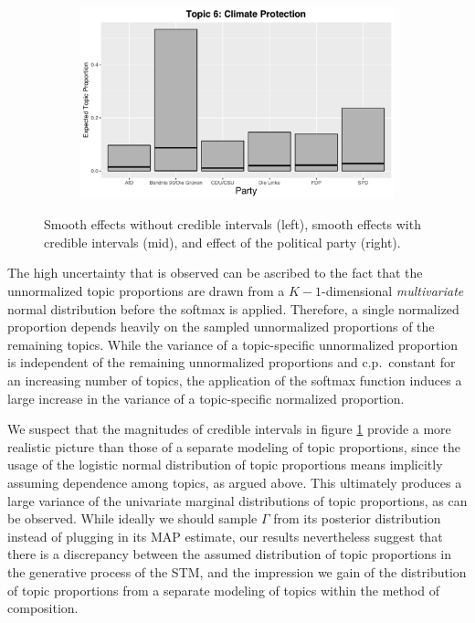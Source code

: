 \begin{figure}[h!]
\begin{subfigure}[b]{0.3\linewidth}
    \includegraphics[width=\linewidth]{../plots/5_1/direct_t6_cat.pdf}
  \end{subfigure}
  \caption{Smooth effects without credible intervals (left), smooth effects with credible intervals (mid), and effect of the political party (right).}
  \label{fig:directassessment}
\end{figure}

The high uncertainty that is observed can be ascribed to the fact that the unnormalized topic proportions are drawn from a $K-1$-dimensional \textit{multivariate} normal distribution before the softmax is applied. Therefore, a single normalized proportion depends heavily on the sampled unnormalized proportions of the remaining topics. While the variance of a topic-specific unnormalized proportion is independent of the remaining unnormalized proportions and c.p.\ constant for an increasing number of topics, the application of the softmax function induces a large increase in the variance of a topic-specific normalized proportion.

We suspect that the magnitudes of credible intervals in figure \ref{fig:directassessment} provide a more realistic picture than those of a separate modeling of topic proportions, since the usage of the logistic normal distribution of topic proportions means implicitly assuming dependence among topics, as argued above. This ultimately produces a large variance of the univariate marginal distributions of topic proportions, as can be observed. While ideally we should sample $\Gamma$ from its posterior distribution instead of plugging in its MAP estimate, our results nevertheless suggest that there is a discrepancy between the assumed distribution of topic proportions in the generative process of the STM, and the impression we gain of the distribution of topic proportions from a separate modeling of topics within the method of composition.

